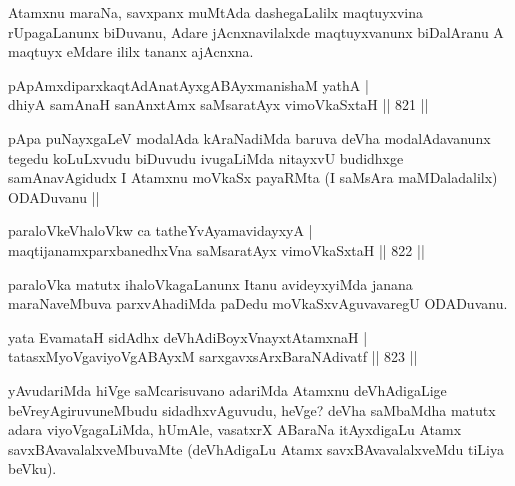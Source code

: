 \begin{artha}
Atamxnu maraNa, savxpanx muMtAda dashegaLalilx maqtuyxvina rUpagaLanunx biDuvanu, Adare jAcnxnavilalxde maqtuyxvanunx biDalAranu A maqtuyx eMdare ililx tananx ajAcnxna.
\end{artha}


\begin{shl}
pApAmxdiparxkaqtAdAnatAyxgABAyxmanishaM yathA | \\
dhiyA samAnaH sanAnxtAmx saMsaratAyx vimoVkaSxtaH \hfill||  821 ||  
\end{shl}

\begin{artha}
pApa puNayxgaLeV modalAda kAraNadiMda baruva deVha modalAdavanunx tegedu koLuLxvudu biDuvudu ivugaLiMda nitayxvU budidhxge samAnavAgidudx I Atamxnu moVkaSx payaRMta (I saMsAra maMDaladalilx) ODADuvanu ||
\end{artha}


\begin{shl}
paraloVkeVhaloVkw ca tatheYvAyamavidayxyA | \\
maqtijanamxparxbanedhxVna saMsaratAyx vimoVkaSxtaH \hfill||  822 ||  
\end{shl}

\begin{artha}
paraloVka matutx ihaloVkagaLanunx Itanu avideyxyiMda janana maraNaveMbuva parxvAhadiMda paDedu moVkaSxvAguvavaregU ODADuvanu.
\end{artha}


\begin{shl}
yata EvamataH sidAdhx deVhAdiBoyxV\s nayxtA\s \s tamxnaH | \\
tatasxMyoVgaviyoVgABAyxM sarxgavxsArxBaraNAdivatf \hfill||  823 ||  
\end{shl}

\begin{artha}
yAvudariMda hiVge saMcarisuvano adariMda Atamxnu deVhAdigaLige beVreyAgiruvuneMbudu sidadhxvAguvudu, heVge? deVha saMbaMdha matutx adara viyoVgagaLiMda, hUmAle, vasatxrX ABaraNa itAyxdigaLu Atamx savxBAvavalalxveMbuvaMte (deVhAdigaLu Atamx savxBAvavalalxveMdu tiLiya beVku).
\end{artha}

